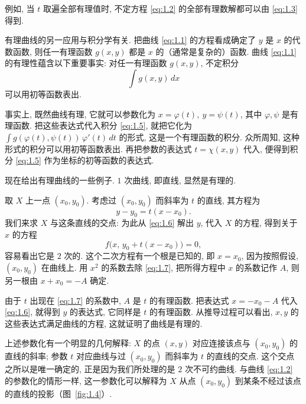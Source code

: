 例如, 当 $t$ 取遍全部有理值时, 不定方程 \eqref{eq:1.2} 的全部有理数解都可以由 \eqref{eq:1.3} 得到.

有理曲线的另一应用与积分学有关. 把曲线 \eqref{eq:1.1} 的方程看成确定了 $y$ 是 $x$ 的代数函数, 则任一有理函数 $g(x,y)$ 都是 $x$ 的（通常是复杂的）函数. 曲线 \eqref{eq:1.1} 的有理性蕴含以下重要事实: 对任一有理函数 $g(x,y)$, 不定积分
\begin{equation}
	\label{eq:1.5}
	\int g(x,y) \, dx
\end{equation}
可以用初等函数表出.

事实上, 既然曲线有理, 它就可以参数化为 $x = \varphi(t),\ y = \psi(t)$, 其中 $\varphi, \psi$ 是有理函数. 把这些表达式代入积分 \eqref{eq:1.5}, 就把它化为 $\int g(\varphi(t), \psi(t))\, \varphi'(t)\, dt$ 的形式, 这是一个有理函数的积分. 众所周知, 这种形式的积分可以用初等函数表出. 再把参数的表达式 $t = \chi(x,y)$ 代入, 便得到积分 \eqref{eq:1.5} 作为坐标的初等函数的表达式.

现在给出有理曲线的一些例子. $1$ 次曲线, 即直线, 显然是有理的.

\begin{example}[不可约二次曲线是有理的]\label{exam:conic-rational}
	取 $X$ 上一点 $(x_0, y_0)$. 考虑过 $(x_0, y_0)$ 而斜率为 $t$ 的直线, 其方程为
	\begin{equation}
		\label{eq:1.6}
		y - y_0 = t(x - x_0).
	\end{equation}
	我们来求 $X$ 与这条直线的交点: 为此从 \eqref{eq:1.6} 解出 $y$, 代入 $X$ 的方程, 得到关于 $x$ 的方程
	\begin{equation}
		\label{eq:1.7}
		f\bigl(x,\, y_0 + t(x - x_0)\bigr) = 0,
	\end{equation}
	容易看出它是 $2$ 次的. 这个二次方程有一个根是已知的, 即 $x = x_0$, 因为按照假设, $(x_0, y_0)$ 在曲线上. 用 $x^2$ 的系数去除 \eqref{eq:1.7}, 把所得方程中 $x$ 的系数记作 $A$, 则另一根由 $x + x_0 = -A$ 确定.

	由于 $t$ 出现在 \eqref{eq:1.7} 的系数中, $A$ 是 $t$ 的有理函数. 把表达式 $x = -x_0 - A$ 代入 \eqref{eq:1.6}, 就得到 $y$ 的表达式, 它同样是 $t$ 的有理函数. 从推导过程可以看出, $x, y$ 的这些表达式满足曲线的方程, 这就证明了曲线是有理的.
\end{example}

上述参数化有一个明显的几何解释: $X$ 的点 $(x,y)$ 对应连接该点与 $(x_0, y_0)$ 的直线的斜率; 参数 $t$ 对应曲线与过 $(x_0, y_0)$ 而斜率为 $t$ 的直线的交点. 这个交点之所以是唯一确定的, 正是因为我们所处理的是 $2$ 次不可约曲线. 与曲线 \eqref{eq:1.2} 的参数化的情形一样, 这一参数化可以解释为 $X$ 从点 $(x_0, y_0)$ 到某条不经过该点的直线的投影（图~\ref{fig:1.4}）.

